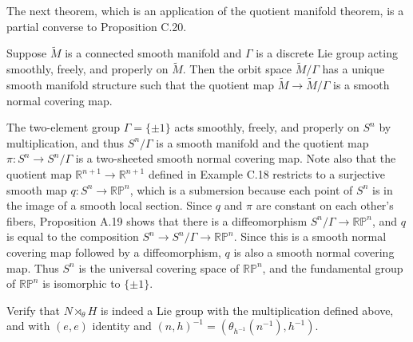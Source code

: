 The next theorem, which is an application of the quotient manifold theorem, is a partial converse to Proposition C.20.

\begin{proposition}\label{prop:quotient-orbit-space-covering-map}

Suppose $\widetilde{M}$ is a connected smooth manifold and $\Gamma$ is a discrete Lie group acting smoothly, freely, and properly on $\widetilde{M}$. Then the orbit space $\widetilde{M}/\Gamma$ has a unique smooth manifold structure such that the quotient map $\widetilde{M} \to \widetilde{M}/\Gamma$ is a smooth normal covering map.
\end{proposition}

\begin{example}\label{ex:universal-covering-projective-space}

The two-element group $\Gamma = \{\pm 1\}$ acts smoothly, freely, and properly on $S^n$ by multiplication, and thus $S^n/\Gamma$ is a smooth manifold and the quotient map $\pi: S^n \to S^n/\Gamma$ is a two-sheeted smooth normal covering map. Note also that the quotient map $\mathbb{R}^{n+1} \to \mathbb{R}^{n+1}$ defined in Example C.18 restricts to a surjective smooth map $q: S^n \to \mathbb{RP}^n$, which is a submersion because each point of $S^n$ is in the image of a smooth local section. Since $q$ and $\pi$ are constant on each other's fibers, Proposition A.19 shows that there is a diffeomorphism $S^n/\Gamma \to \mathbb{RP}^n$, and $q$ is equal to the composition $S^n \to S^n/\Gamma \to \mathbb{RP}^n$. Since this is a smooth normal covering map followed by a diffeomorphism, $q$ is also a smooth normal covering map. Thus $S^n$ is the universal covering space of $\mathbb{RP}^n$, and the fundamental group of $\mathbb{RP}^n$ is isomorphic to $\{\pm 1\}$.
\end{example}

\begin{exercise}
\label{exer:semidirect-product-verification}
Verify that $N \rtimes_\theta H$ is indeed a Lie group with the multiplication defined above, and with $(e,e)$ identity and $(n,h)^{-1} = (\theta_{h^{-1}}(n^{-1}),h^{-1})$.
\end{exercise}
